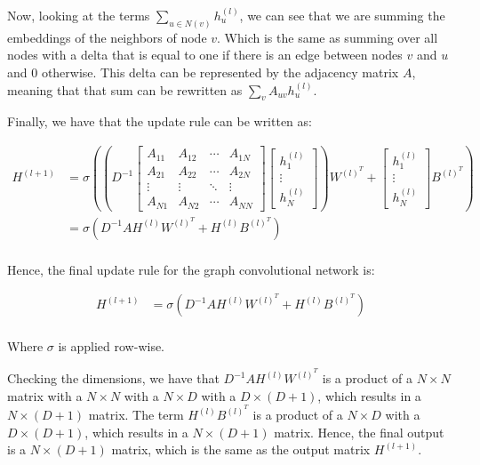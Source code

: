 \documentclass{article}
\begin{document}
Now, looking at the terms $\sum_{u \in N(v)} h_u^{(l)}$, we can see that we are summing the embeddings of the neighbors of node $v$.
Which is the same as summing over all nodes with a delta that is equal to one if there is an edge between nodes $v$ and $u$ and 0 otherwise. This
delta can be represented by the adjacency matrix $A$, meaning that that sum can be rewritten as $\sum_{v} A_{uv} h_u^{(l)}$.

Finally, we have that the update rule can be written as:

\begin{align*}
    H^{(l+1)} & = \sigma \left( \left(
        D^{-1}
        \begin{bmatrix}
        A_{11} & A_{12} & \cdots & A_{1N} \\
        A_{21} & A_{22} & \cdots & A_{2N} \\
        \vdots & \vdots & \ddots & \vdots \\
        A_{N1} & A_{N2} & \cdots & A_{NN}
    \end{bmatrix}
    \begin{bmatrix}
        h_1^{(l)} \\
        \vdots \\
        h_N^{(l)}
    \end{bmatrix}
    \right) W^{(l)^T} + \begin{bmatrix}
        h_1^{(l)} \\
        \vdots \\
        h_N^{(l)}
    \end{bmatrix} B^{(l)^T}
    \right) \\
    &=
    \sigma \left(
        D^{-1} A H^{(l)} W^{(l)^T}
     + H^{(l)} B^{(l)^T}
    \right) \\
\end{align*}

Hence, the final update rule for the graph convolutional network is:

\begin{align*}
    H^{(l+1)} & = \sigma \left(
        D^{-1} A H^{(l)} W^{(l)^T}
     + H^{(l)} B^{(l)^T}
    \right) \\
\end{align*}

Where $\sigma$ is applied row-wise.

Checking the dimensions, we have that $D^{-1} A H^{(l)} W^{(l)^T}$ is a product of a $N \times N$ matrix with a $N \times N$ with a $N \times D$ with a $D \times (D + 1)$,
which results in a $N \times (D + 1)$ matrix. The term $H^{(l)} B^{(l)^T}$ is a product of a $N \times D$ with a $D \times (D + 1)$, which results in a $N \times (D + 1)$ matrix.
Hence, the final output is a $N \times (D + 1)$ matrix, which is the same as the output matrix $H^{(l + 1)}$.
\end{document}
